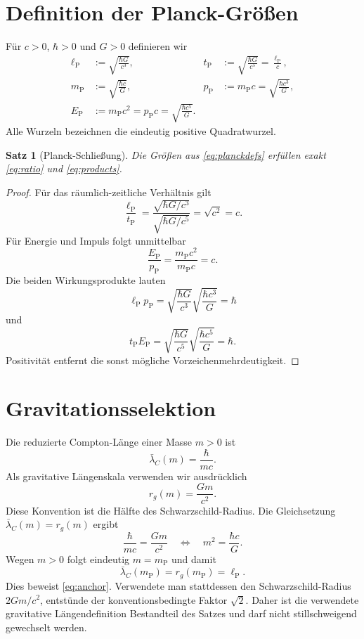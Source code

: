 \documentclass[11pt,a4paper]{article}
\newtheorem{satz}{Satz}
\newcommand{\lP}{\ell_{\mathrm P}}
\newcommand{\tP}{t_{\mathrm P}}
\newcommand{\mP}{m_{\mathrm P}}
\newcommand{\pP}{p_{\mathrm P}}
\newcommand{\EP}{E_{\mathrm P}}
\begin{document}
\section{Definition der Planck-Größen}

Für $c>0$, $\hbar>0$ und $G>0$ definieren wir
\begin{align}
 \lP&:=\sqrt{\frac{\hbar G}{c^3}},
 &\tP&:=\sqrt{\frac{\hbar G}{c^5}}=\frac{\lP}{c},\\
 \mP&:=\sqrt{\frac{\hbar c}{G}},
 &\pP&:=\mP c=\sqrt{\frac{\hbar c^3}{G}},\\
 \EP&:=\mP c^2=\pP c=\sqrt{\frac{\hbar c^5}{G}}.
 \label{eq:planckdefs}
\end{align}
Alle Wurzeln bezeichnen die eindeutig positive Quadratwurzel.

\begin{satz}[Planck-Schließung]
Die Größen aus \eqref{eq:planckdefs} erfüllen exakt
\eqref{eq:ratio} und \eqref{eq:products}.
\end{satz}

\begin{proof}
Für das räumlich-zeitliche Verhältnis gilt
\[
 \frac{\lP}{\tP}
 =\frac{\sqrt{\hbar G/c^3}}{\sqrt{\hbar G/c^5}}
 =\sqrt{c^2}=c.
\]
Für Energie und Impuls folgt unmittelbar
\[
 \frac{\EP}{\pP}=\frac{\mP c^2}{\mP c}=c.
\]
Die beiden Wirkungsprodukte lauten
\[
 \lP\pP
 =\sqrt{\frac{\hbar G}{c^3}}
  \sqrt{\frac{\hbar c^3}{G}}
 =\hbar
\]
und
\[
 \tP\EP
 =\sqrt{\frac{\hbar G}{c^5}}
  \sqrt{\frac{\hbar c^5}{G}}
 =\hbar.
\]
Positivität entfernt die sonst mögliche Vorzeichenmehrdeutigkeit.
\end{proof}

\section{Gravitationsselektion}

Die reduzierte Compton-Länge einer Masse $m>0$ ist
\[
 \bar\lambda_C(m)=\frac{\hbar}{mc}.
\]
Als gravitative Längenskala verwenden wir ausdrücklich
\[
 r_g(m)=\frac{Gm}{c^2}.
\]
Diese Konvention ist die Hälfte des Schwarzschild-Radius. Die Gleichsetzung
$\bar\lambda_C(m)=r_g(m)$ ergibt
\[
 \frac{\hbar}{mc}=\frac{Gm}{c^2}
 \quad\Longleftrightarrow\quad
 m^2=\frac{\hbar c}{G}.
\]
Wegen $m>0$ folgt eindeutig $m=\mP$ und damit
\[
 \bar\lambda_C(\mP)=r_g(\mP)=\lP.
\]
Dies beweist \eqref{eq:anchor}. Verwendete man stattdessen den
Schwarzschild-Radius $2Gm/c^2$, entstünde der konventionsbedingte Faktor
$\sqrt{2}$. Daher ist die verwendete gravitative Längendefinition Bestandteil
des Satzes und darf nicht stillschweigend gewechselt werden.
\end{document}
